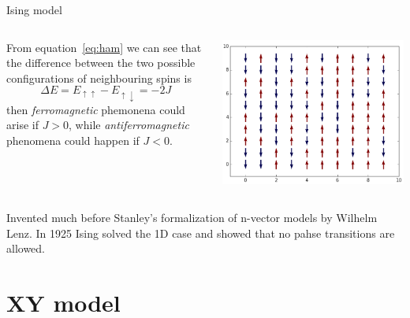 \documentclass{beamer}
\begin{document}
\begin{frame}{Ising model}

\begin{columns}
From equation~\ref{eq:ham} we can see that the difference between the two possible
configurations of neighbouring spins is
\begin{equation}
\Delta E = E_{\uparrow \uparrow} - E_{\uparrow \downarrow} = -2 J
\end{equation}
then \emph{ferromagnetic} phemonena could arise if $J > 0$, while  
\emph{antiferromagnetic} phenomena could happen if $J < 0$.

\includegraphics[scale=0.18]{2D_ising.png}

\end{columns}

\vspace{5mm}
Invented much before Stanley's formalization of n-vector models by Wilhelm Lenz.
In 1925 Ising solved the 1D case and showed that no pahse transitions are allowed.

\end{frame}


\section{XY model}
\end{document}
